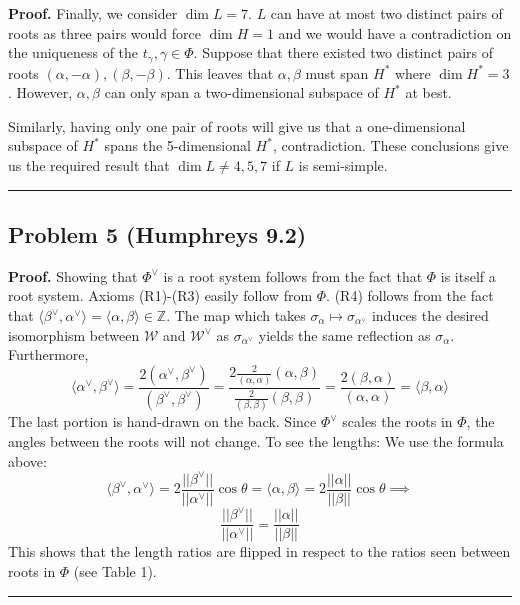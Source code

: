 \documentclass[12pt]{article}%
\newenvironment{proof}[1][Proof]{\textbf{#1.} }{\ \rule{0.5em}{0.5em}}
\begin{document}
\begin{proof}
 Finally, we consider $\dim L = 7$. $L$ can have at most two distinct pairs of roots as three pairs would force $\dim H = 1$ and we would have a contradiction on the uniqueness of the $t_{\gamma}, \gamma \in \Phi$. Suppose that there existed two distinct pairs of roots $(\alpha,-\alpha),(\beta,-\beta)$. This leaves that $\alpha,\beta$ must span $H^*$ where $\dim H^* = 3$. However, $\alpha,\beta$ can only span a two-dimensional subspace of $H^*$ at best.

 Similarly, having only one pair of roots will give us that a one-dimensional subspace of $H^*$ spans the 5-dimensional $H^*$, contradiction. These conclusions give us the required result that $\dim L \neq 4,5,7$ if $L$ is semi-simple.
\end{proof}

\subsection*{Problem 5 (Humphreys 9.2)}
\begin{proof}
  Showing that $\Phi^{\vee}$ is a root system follows from the fact that $\Phi$ is itself a root system. Axioms (R1)-(R3) easily follow from $\Phi$. (R4) follows from the fact that
  $\langle \beta^{\vee},\alpha^{\vee} \rangle = \langle \alpha,\beta \rangle \in \mathbb{Z}$. The map which takes $\sigma_{\alpha} \mapsto \sigma_{\alpha^{\vee}}$ induces the desired isomorphism between $\mathcal{W}$ and $\mathcal{W^{\vee}}$ as $\sigma_{\alpha^{\vee}}$ yields the same reflection as $\sigma_{\alpha}$. Furthermore,
  $$ \langle \alpha^{\vee},\beta^{\vee} \rangle = \frac{2(\alpha^{\vee},\beta^{\vee})}{(\beta^{\vee},\beta^{\vee})} = \frac{2\frac{2}{(\alpha,\alpha)}(\alpha,\beta)}{\frac{2}{(\beta,\beta)}(\beta,\beta)} = \frac{2(\beta,\alpha)}{(\alpha,\alpha)} = \langle \beta,\alpha\rangle$$
  The last portion is hand-drawn on the back. Since $\Phi^{\vee}$ scales the roots in $\Phi$, the angles between the roots will not change. To see the lengths: We use the formula above:
  $$ \langle \beta^{\vee}, \alpha^{\vee} \rangle = 2 \frac{||\beta^{\vee}||}{||\alpha^{\vee}||} \cos \theta = \langle \alpha, \beta \rangle = 2 \frac{||\alpha||}{||\beta||} \cos \theta \implies $$
  $$ \frac{||\beta^{\vee}||}{||\alpha^{\vee}||} = \frac{||\alpha||}{||\beta||} $$
  This shows that the length ratios are flipped in respect to the ratios seen between roots in $\Phi$ (see Table 1).
\end{proof}
\end{document}
